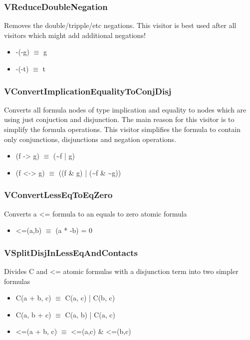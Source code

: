 \documentclass{article}
\begin{document}
			\subsubsection*{VReduceDoubleNegation}
				Removes the double/tripple/etc negations. 
				This visitor is best used after all visitors which might add additional negations!
				\begin{itemize}
					\item -(-g) $\equiv$ g
					\item -(-t) $\equiv$ t
				\end{itemize}
			\subsubsection*{VConvertImplicationEqualityToConjDisj}
				Converts all formula nodes of type implication and equality to nodes 
				which are using just conjuction and disjunction. The main reason for this visitor is to simplify the formula operations. 
				This visitor simplifies the formula to contain only conjunctions, disjunctions and negation operations.
				\begin{itemize}
					\item (f -> g)  $\equiv$ (\textasciitilde f | g)
					\item (f <-> g) $\equiv$ ((f \& g) | (\textasciitilde f \& \textasciitilde g))
				\end{itemize}
			\subsubsection*{VConvertLessEqToEqZero}
				Converts a <= formula to an equals to zero atomic formula
				\begin{itemize}
					\item <=(a,b) $\equiv$ (a * -b) = 0
				\end{itemize}
			\subsubsection*{VSplitDisjInLessEqAndContacts}
				Divides C and <= atomic formulas with a disjunction term into two simpler formulas
				\begin{itemize}
					\item C(a + b, c) $\equiv$ C(a, c) | C(b, c)
					\item C(a, b + c) $\equiv$ C(a, b) | C(a, c)
					\item <=(a + b, c) $\equiv$ <=(a,c) \& <=(b,c)
				\end{itemize}
\end{document}
